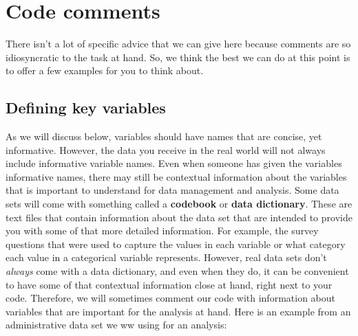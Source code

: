 \documentclass[
  letterpaper,
  DIV=11,
  numbers=noendperiod]{scrreprt}
\begin{document}
\section{Code comments}\label{code-comments}

There isn't a lot of specific advice that we can give here because
comments are so idiosyncratic to the task at hand. So, we think the best
we can do at this point is to offer a few examples for you to think
about.

\subsection{Defining key variables}\label{defining-key-variables}

As we will discuss below, variables should have names that are concise,
yet informative. However, the data you receive in the real world will
not always include informative variable names. Even when someone has
given the variables informative names, there may still be contextual
information about the variables that is important to understand for data
management and analysis. Some data sets will come with something called
a \textbf{codebook} or \textbf{data dictionary}. These are text files
that contain information about the data set that are intended to provide
you with some of that more detailed information. For example, the survey
questions that were used to capture the values in each variable or what
category each value in a categorical variable represents. However, real
data sets don't \emph{always} come with a data dictionary, and even when
they do, it can be convenient to have some of that contextual
information close at hand, right next to your code. Therefore, we will
sometimes comment our code with information about variables that are
important for the analysis at hand. Here is an example from an
administrative data set we ww using for an analysis:
\end{document}

